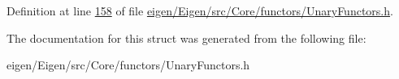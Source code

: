 Definition at line \hyperlink{eigen_2_eigen_2src_2_core_2functors_2_unary_functors_8h_source_l00158}{158} of file \hyperlink{eigen_2_eigen_2src_2_core_2functors_2_unary_functors_8h_source}{eigen/\+Eigen/src/\+Core/functors/\+Unary\+Functors.\+h}.



The documentation for this struct was generated from the following file\+:\begin{DoxyCompactItemize}
\item 
eigen/\+Eigen/src/\+Core/functors/\+Unary\+Functors.\+h\end{DoxyCompactItemize}
